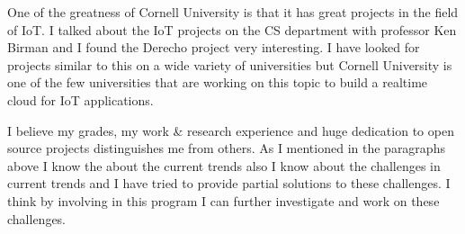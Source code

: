 \documentclass[11pt,a4paper,sans]{moderncv}        %
\begin{document}
One of the greatness of Cornell University is that it has great projects in
the field of IoT. I talked about the IoT projects on the CS department with
professor Ken Birman and I found the Derecho project very interesting. I have
looked for projects similar to this on a wide variety of universities but
Cornell University is one of the few universities that are working on this
topic to build a realtime cloud for IoT applications.

I believe my grades, my work \& research experience and huge dedication
to open source projects distinguishes me from others. As I mentioned in the
paragraphs above I know the about the current trends also I know about the
challenges in current trends and I have tried to provide partial solutions
to these challenges. I think by involving in this program I can further
investigate and work on these challenges.

\makeletterclosing
\end{document}

